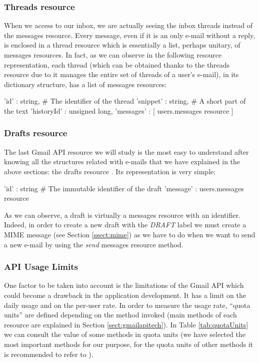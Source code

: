 \subsubsection{Threads resource}\label{sssect:threads}
When we access to our inbox, we are actually seeing the inbox threads instead of the messages resource. Every message, even if it is an only e-mail without a reply, is enclosed in a thread resource \citep[/v1/reference/users/threads]{gmailAPI} which is essentially a list, perhaps unitary, of messages resources. In fact, as we can observe in the following resource representation, each thread (which can be obtained thanks to the threads resource due to it manages the entire set of threads of a user's e-mail), in its dictionary structure, has a list of messages resources:

\begin{python}
	{
		'id' : string, # The identifier of the thread
		'snippet' : string, # A short part of the text
		'historyId' : unsigned long,
		'messages' : [ users.messages resource ]
	}
\end{python}

\subsubsection{Drafts resource}\label{sssect:drafts}
The last Gmail API resource we will study is the most easy to understand after knowing all the structures related with e-mails that we have explained in the above sections: the drafts resource \citep[/v1/reference/users/drafts]{gmailAPI}. Its representation is very simple:

\begin{python}
	{
		'id' : string # The immutable identifier of the draft
		'message' : users.messages resource
	}
\end{python}

As we can observe, a draft is virtually a messages resource with an identifier. Indeed, in order to create a new draft with the \textit{DRAFT} label we must create a MIME message (see Section \ref{ssect:mime}) as we have to do when we want to send a new e-mail by using the \textit{send} messages resource method.

\subsubsection{API Usage Limits} \label{sssect:apilimits}
One factor to be taken into account is the limitations of the Gmail API \citep[/v1/reference/quota]{gmailAPI} which could become a drawback in the application development. It has a limit on the daily usage and on the per-user rate. In order to measure the usage rate, ``quota units'' are defined depending on the method invoked (main methods of each resource are explained in Section \ref{sect:gmailapitech}). In Table \ref{tab:quotaUnits} we can consult the value of some methods in quota units (we have selected the most important methods for our purpose, for the quota units of other methods it is recommended to refer to \cite[/v1/reference/quota]{gmailAPI}).

